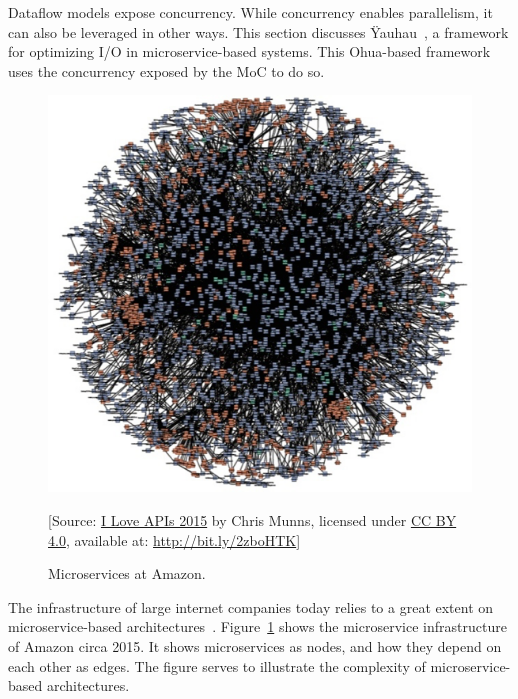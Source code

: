 Dataflow models expose concurrency. While concurrency enables parallelism, it can also be leveraged in other ways. 
This section discusses \"{Y}auhau~\cite{ertel_cc18}, a framework for optimizing \ac{I/O} in microservice-based systems.
This Ohua-based framework uses the concurrency exposed by the \ac{MoC} to do so.

\begin{figure}[t]
        \centering
        \includegraphics[scale=0.25]{figures/amazon-microservices.png}\\
        \small

        [Source: \href{https://www.slideshare.net/apigee/i-love-apis-2015-microservices-at-amazon-54487258}{I Love APIs 2015} by Chris Munns, licensed under \href{https://creativecommons.org/licenses/by/4.0/}{CC BY 4.0}, available at: \href{http://bit.ly/2zboHTK}{\url{http://bit.ly/2zboHTK}}]
        \vspace{-1mm}
        \caption{Microservices at Amazon.}
        \label{fig:amazon_death_star}
        \vspace{-3mm}
\end{figure}

The infrastructure of large internet companies today relies to a great extent on microservice-based architectures~\cite{decandia2007dynamo,marlow2014haxl}.
Figure~\ref{fig:amazon_death_star} shows the microservice infrastructure of Amazon circa 2015. 
It shows microservices as nodes, and how they depend on each other as edges.
The figure serves to illustrate the complexity of microservice-based architectures.

